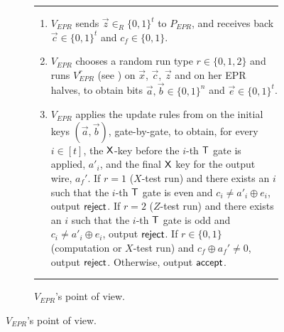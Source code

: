 \documentclass{toc}
\begin{document}
\begin{figure}[htbp]
  \begin{subfigure}{\textwidth}
\rule[1ex]{\textwidth}{0.5pt}
\begin{enumerate}
\item $V_{EPR}$ sends $\vec{z}\in_R\{0,1\}^t$ to $P_{EPR}$,
and receives back $\vec{c}\in\{0,1\}^t$ and $c_f\in\{0,1\}$.
\item $V_{EPR}$ chooses a random run type $r\in\{0,1,2\}$ and runs $V_{EPR}^r$ (see ) on $\vec{x}$, $\vec{c}$, $\vec{z}$ and on her EPR halves, to obtain bits $\vec{a},\vec{b}\in\{0,1\}^n$ and $\vec{e}\in\{0,1\}^t$. 
\item $V_{EPR}$ applies the update rules from  on the initial keys $(\vec{a},\vec{b})$, gate-by-gate, to obtain, for every $i\in [t]$, the $\sf X$-key before the $i$-th $\sf T$ gate is applied, $a'_i$, and the final $\sf X$ key for the output wire, $a_f'$. If $r=1$ ($X$-test run) and there exists an $i$ such that the $i$-th $\sf T$ gate is even and $c_i\neq a'_i\oplus e_i$, output $\sf reject$. If $r=2$ ($Z$-test run) and there exists an $i$ such that the $i$-th $\sf T$ gate is odd and $c_i\neq a'_i\oplus e_i$, output $\sf reject$. If $r\in\{0,1\}$ (computation or $X$-test run) and $c_f\oplus a_f'\neq 0$, output $\sf reject$. Otherwise, output $\sf accept$. 
\end{enumerate}
\rule[2ex]{\textwidth}{0.5pt} %
    \caption{ $V_{EPR}$'s point of view.}
  \label{fig:original-protocol-VEPR}
    \end{subfigure}

\vspace{0.15cm}      %


\end{figure}
\end{document}
